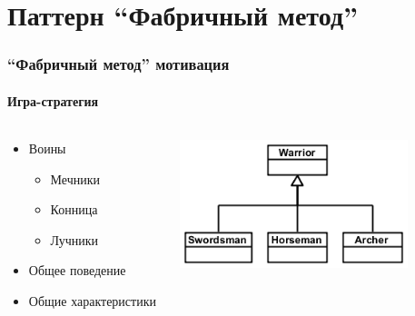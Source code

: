 \documentclass{../../slides-style}
\begin{document}
    \section{Паттерн ``Фабричный метод''}

    \begin{frame}
        \frametitle{``Фабричный метод'' мотивация}
        \framesubtitle{Игра-стратегия}
        \begin{columns}
            \begin{column}{0.5\textwidth}
                \begin{itemize}
                    \item Воины
                    \begin{itemize}
                        \item Мечники
                        \item Конница
                        \item Лучники
                    \end{itemize}
                    \item Общее поведение
                    \item Общие характеристики
                \end{itemize}
            \end{column}
            \begin{column}{0.5\textwidth}
                \begin{center}
                    \includegraphics[width=0.8\textwidth]{warriors.png}
                \end{center}
            \end{column}
        \end{columns}
    \end{frame}
\end{document}
